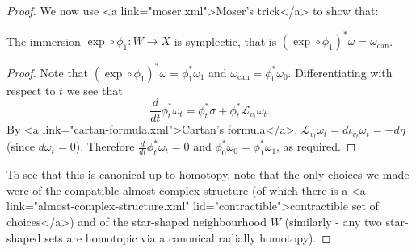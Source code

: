 \documentclass{article}
\begin{document}
\begin{proof}
  We now use <a link="moser.xml">Moser's trick</a> to show that:
  \begin{Claim}
    The immersion $\exp\circ\phi_1\colon W\to X$ is symplectic, that is $(\exp\circ\phi_1)^*\omega=\omega_{\mathrm{can}}$.
  \end{Claim}
  \begin{proof}
    Note that $(\exp\circ\phi_1)^*\omega=\phi_1^*\omega_1$ and $\omega_{\mathrm{can}}=\phi_0^*\omega_0$. Differentiating with respect to $t$ we see that
  \[\frac{d}{dt}\phi_t^*\omega_t=\phi_t^*\sigma+\phi_t^*\mathcal{L}_{v_t}\omega_t.\]
  By <a link="cartan-formula.xml">Cartan's formula</a>, $\mathcal{L}_{v_t}\omega_t=d\iota_{v_t}\omega_t=-d\eta$ (since $d\omega_t=0$). Therefore $\frac{d}{dt}\phi_t^*\omega_t=0$ and $\phi_0^*\omega_0=\phi_1^*\omega_1$, as required.
  \end{proof}

  To see that this is canonical up to homotopy, note that the only choices we made were of the compatible almost complex structure (of which there is a <a link="almost-complex-structure.xml" lid="contractible">contractible set of choices</a>) and of the star-shaped neighbourhood $W$ (similarly - any two star-shaped sets are homotopic via a canonical radially homotopy).
\end{proof}
\end{document}
